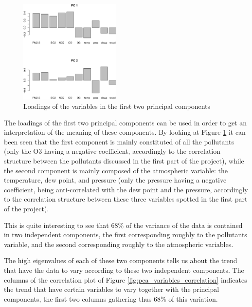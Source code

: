 \documentclass[a4paper, 12pt]{article}
\begin{document}
    \begin{figure}
        \vspace{-1em}
        \centering
        \includegraphics[width = 0.45\textwidth]{resources/pdf/pca_loadings.pdf}
        \caption{Loadings of the variables in the first two principal components}
        \label{fig:pca_loadings}
        \vspace{-1em}
    \end{figure}
    
    The loadings of the first two principal components can be used in order to get an interpretation of the meaning of these components. By looking at Figure \ref{fig:pca_loadings} it can been seen that the first component is mainly constituted of all the pollutants (only the O3 having a negative coefficient, accordingly to the correlation structure between the pollutants discussed in the first part of the project), while the second component is mainly composed of the atmospheric variable: the temperature, dew point, and pressure (only the pressure having a negative coefficient, being anti-correlated with the dew point and the pressure, accordingly to the correlation structure between these three variables spotted in the first part of the project). 

    This is quite interesting to see that $68\%$ of the variance of the data is contained in two independent components, the first corresponding roughly to the pollutants variable, and the second corresponding roughly to the atmospheric variables.

    The high eigenvalues of each of these two components tells us about the trend that have the data to vary according to these two independent components. The columns of the correlation plot of Figure \ref{fig:pca_variables_correlation} indicates the trend that have certain variables to vary together with the principal components, the first two columns gathering thus 68\% of this variation.
\end{document}
